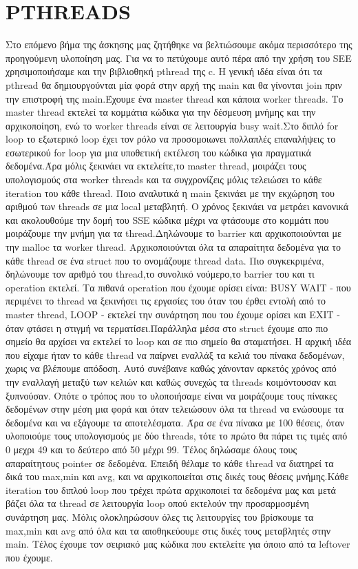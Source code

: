 \documentclass{FR16}
\begin{document}
\section{PTHREADS}
Στο επόμενο βήμα της άσκησης μας ζητήθηκε να βελτιώσουμε ακόμα περισσότερο της προηγούμενη υλοποίηση μας. Για να το πετύχουμε αυτό πέρα από την χρήση του SEE χρησιμοποιήσαμε και την βιβλιοθηκή pthread της c. Η γενική ιδέα είναι ότι τα pthread θα δημιουργούνται μία φορά στην αρχή της main και θα γίνονται join πριν την επιστροφή της main.Έχουμε ένα master thread και κάποια worker threads. Το master thread εκτελεί τα κομμάτια κώδικα για την δέσμευση μνήμης και την αρχικοποίηση, ενώ το worker threads είναι σε λειτουργία busy wait.Στο διπλό for loop το εξωτερικό loop έχει τον ρόλο να προσομοιωνει πολλαπλές επαναλήψεις το εσωτερικού for loop για μια υποθετική εκτέλεση του κώδικα για πραγματικά δεδομένα.Άρα μόλις ξεκινάει να εκτελείτε,το master thread, μοιράζει τους υπολογισμούς στα worker threads και τα συγχρονίζεις μόλις τελειώσει το κάθε iteration του κάθε thread. \newline Ποιο αναλυτικά η main ξεκινάει με την εκχώρηση του αριθμού των threads σε μια local μεταβλητή. Ο χρόνος ξεκινάει να μετράει κανονικά και ακολουθούμε την δομή του SSE κώδικα μέχρι να φτάσουμε στο κομμάτι που μοιράζουμε την μνήμη για τα thread.Δηλώνουμε το barrier και αρχικοποιούνται με την malloc τα worker thread. Αρχικοποιούνται όλα τα απαραίτητα δεδομένα για το κάθε thread σε ένα struct που το ονομάζουμε thread data. Πιο συγκεκριμένα, δηλώνουμε τον αριθμό του thread,το συνολικό νούμερο,το barrier του και τι operation εκτελεί. Τα πιθανά operation που έχουμε ορίσει είναι: BUSY WAIT - που περιμένει το thread να ξεκινήσει τις εργασίες του όταν του έρθει εντολή από το master thread, LOOP - εκτελεί την συνάρτηση που του έχουμε ορίσει και EXIT - όταν φτάσει η στιγμή να τερματίσει.\newline Παράλληλα μέσα στο struct έχουμε απο πιο σημείο θα αρχίσει να εκτελεί το loop και σε πιο σημείο θα σταματήσει.   Η αρχική ιδέα που είχαμε ήταν το κάθε thread να παίρνει εναλλάξ τα κελιά του πίνακα δεδομένων, χωρις να βλέπουμε απόδοση. Αυτό συνέβαινε καθώς χάνονταν αρκετός χρόνος από την εναλλαγή μεταξύ των κελιών και καθώς συνεχώς τα threads κοιμόντουσαν και ξυπνούσαν. Οπότε ο τρόπος που το υλοποιήσαμε είναι να μοιράζουμε τους πίνακες δεδομένων στην μέση μια φορά και όταν τελειώσουν όλα τα thread να ενώσουμε τα δεδομένα και να εξάγουμε τα αποτελέσματα. Άρα σε ένα πίνακα με 100 θέσεις, όταν υλοποιούμε τους υπολογισμούς με δύο threads, τότε το πρώτο θα πάρει τις τιμές από 0 μεχρι 49 και το δεύτερο από 50 μέχρι 99. Τέλος δηλώσαμε όλους τους απαραίτητους pointer σε δεδομένα. Επειδή θέλαμε το κάθε thread να διατηρεί τα δικά του max,min και avg, και να αρχικοποιείται στις δικές τους θέσεις μνήμης.\newline Κάθε iteration του διπλού loop που τρέχει πρώτα αρχικοποιεί τα δεδομένα μας και μετά βάζει όλα τα thread σε λειτουργία loop οπού εκτελούν την προσαρμοσμένη συνάρτηση μας. Μόλις ολοκληρώσουν όλες τις λειτουργίες του βρίσκουμε τα max,min και avg από όλα και τα αποθηκεύουμε στις δικές τους μεταβλητές στην main. Τέλος έχουμε τον σειριακό μας κώδικα που εκτελείτε για όποιο από τα leftover που έχουμε.  
\end{document}
